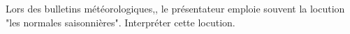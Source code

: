 
Lors des bulletins météorologiques,, le présentateur emploie souvent la locution "les normales saisonnières". Interpréter cette locution.